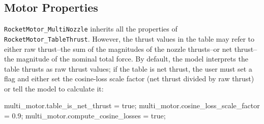 \documentclass[11pt,fleqn]{report}
\begin{document}
\subsection{Motor Properties}
\par \verb|RocketMotor_MultiNozzle| inherits all the properties of \verb|RocketMotor_TableThrust|. However, the thrust values in the table may refer to either raw thrust--the sum of the magnitudes of the nozzle thrusts--or net thrust--the magnitude of the nominal total force. By default, the model interprets the table thrusts as raw thrust values; if the table is net thrust, the user must set a flag and either set the cosine-loss scale factor (net thrust divided by raw thrust) or tell the model to calculate it:
\begin{code}
multi_motor.table_is_net_thrust = true;
multi_motor.cosine_loss_scale_factor = 0.9;
multi_motor.compute_cosine_losses = true;
\end{code}
\end{document}
